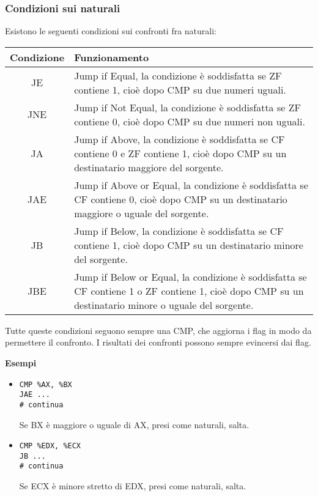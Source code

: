\documentclass[a4paper,11pt]{article}
\begin{document}
\subsubsection{Condizioni sui naturali}
Esistono le seguenti condizioni sui confronti fra naturali:

\begin{table}[h!]
	\center {}
	\begin{tabular} { c  p{10cm} }
		\bfseries Condizione & \bfseries Funzionamento \\
		\hline 
		JE & Jump if Equal, la condizione è soddisfatta se ZF contiene 1, cioè dopo CMP su due numeri uguali. \\
		JNE & Jump if Not Equal, la condizione è soddisfatta se ZF contiene 0, cioè dopo CMP su due numeri non uguali. \\ 
		JA & Jump if Above, la condizione è soddisfatta se CF contiene 0 e ZF contiene 1, cioè dopo CMP su un destinatario maggiore del sorgente. \\
		JAE & Jump if Above or Equal, la condizione è soddisfatta se CF contiene 0, cioè dopo CMP su un destinatario maggiore o uguale del sorgente. \\ 
		JB & Jump if Below, la condizione è soddisfatta se CF contiene 1, cioè dopo CMP su un destinatario minore del sorgente. \\
		JBE & Jump if Below or Equal, la condizione è soddisfatta se CF contiene 1 o ZF contiene 1, cioè dopo CMP su un destinatario minore o uguale del sorgente. \\ 
	\end{tabular}
\end{table}

Tutte queste condizioni seguono sempre una CMP, che aggiorna i flag in modo da permettere il confronto.
I risultati dei confronti possono sempre evincersi dai flag.

\par\medskip
\noindent
\textbf{\textsf{Esempi}} \\
\begin{itemize}
	\item 
\begin{lstlisting}[style=codestyle]	
CMP %AX, %BX
JAE ...
# continua
\end{lstlisting}
Se BX è maggiore o uguale di AX, presi come naturali, salta.

	\item 
\begin{lstlisting}[style=codestyle]	
CMP %EDX, %ECX
JB ...
# continua
\end{lstlisting}
Se ECX è minore stretto di EDX, presi come naturali, salta.
\end{itemize}
\end{document}
